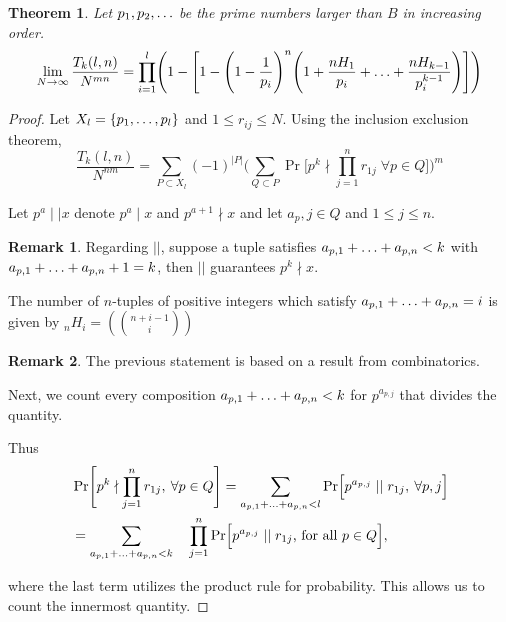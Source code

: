 \documentclass[12pt]{amsart}
\newtheorem{theorem}{Theorem}[subsection]
\theoremstyle{definition}
\newtheorem*{remark}{Remark}
\begin{document}
\begin{theorem}
	Let \(p_1, p_2,\mathellipsis\) be the prime numbers larger than \(B\) in increasing order.
	\begin{equation*}
		\lim\limits_{N\to\infty} \frac{T_k(l,n)}{N^{mn}}=\prod_{i=1}^l\Biggl(1-\Biggl[1-\Biggl(1-\frac{1}{p_i}\Biggr)^n\Biggl(1+\frac{nH_1}{p_i}+\mathellipsis+\frac{nH_{k-1}}{p_i^{k-1}}\Biggr)\Biggr]\Biggr)
	\end{equation*}
\end{theorem}

\begin{proof}
	Let \(X_l=\{p_1,\mathellipsis,p_l\}\) and \(1\leq r_{ij}\leq N\). Using the inclusion exclusion theorem, 
	\begin{equation*}
		\frac{T_k(l,n)}{N^{nm}}=\sum_{P\subset X_l}(-1)^{|P|}\Biggl(\sum_{Q\subset P}\Pr\Biggl[p^k\nmid \prod_{j=1}^{n}r_{1j} \; \forall p\in Q \Biggr]\Biggr)^m
	\end{equation*}
	
	Let \(p^a \mid\mid x\) denote \(p^a\mid x\) and \(p^{a+1}\nmid x\) and let \(a_p,j\in Q\) and \(1\leq j \leq n\).
	
	\begin{remark}
		Regarding \(||\), suppose a tuple satisfies \(a_{p,1}+\mathellipsis+a_{p,n}<k\) with \(a_{p,1}+\mathellipsis+a_{p,n}+1=k\), then \(||\) guarantees \(p^k \nmid x\).
	\end{remark} 
	
	
	The number of \(n\)-tuples of positive integers which satisfy \(a_{p,1}+\mathellipsis+a_{p,n}=i\) is given by \(_nH_i = (\binom{n+i-1}{i})\)
	\begin{remark}
		The previous statement is based on a result from combinatorics.
	\end{remark}
	
	Next, we count every composition \(a_{p,1}+\mathellipsis+a_{p,n}<k\) for \(p^{a_{p,j}}\) that divides the quantity.
	
	Thus \begin{align*}
		&\Pr\Biggl[p^k\nmid \prod_{j=1}^{n}r_{1j},\:\forall p\in Q\Biggr] = \sum_{a_{p,1}+\mathellipsis+a_{p,n}<l}\Pr\Bigl[p^{a_{p,j}} \mid\mid r_{1j},\: \forall p,j\Bigr]\\
		&=\sum_{a_{p,1}+\mathellipsis+a_{p,n}<k}\quad\prod_{j=1}^{n}\Pr\Bigl[p^{a_{p,j}} \mid\mid r_{1j} \text{, for all } p\in Q\Bigr],  
	\end{align*}
	
	where the last term utilizes the product rule for probability. This allows us to count the innermost quantity. 
	

\end{proof}
\end{document}
